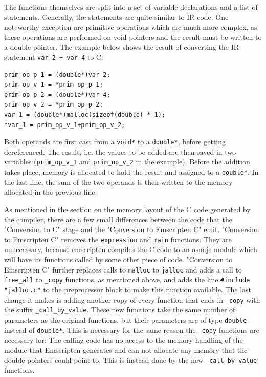 \documentclass[11pt]{report}
\begin{document}
The functions themselves are split into a set of variable declarations and a list of statements. Generally, the statements are quite similar to IR code. One noteworthy exception are primitive operations which are much more complex, as these operations are performed on void pointers and the result must be written to a double pointer. The example below shows the result of converting the IR statement \texttt{var_2 + var_4} to C:

\begin{lstlisting}
prim_op_p_1 = (double*)var_2;
prim_op_v_1 = *prim_op_p_1;
prim_op_p_2 = (double*)var_4;
prim_op_v_2 = *prim_op_p_2;
var_1 = (double*)malloc(sizeof(double) * 1);
*var_1 = prim_op_v_1+prim_op_v_2;
\end{lstlisting}

Both operands are first cast from a \texttt{void*} to a \texttt{double*}, before getting dereferenced. The result, i.e. the values to be added are then saved in two variables (\texttt{prim_op_v_1} and \texttt{prim_op_v_2} in the example). Before the addition takes place, memory is allocated to hold the result and assigned to a \texttt{double*}. In the last line, the sum of the two operands is then written to the memory allocated in the previous line.

As mentioned in the section on the memory layout of the C code generated by the compiler, there are a few small differences between the code that the "Conversion to C" stage and the "Conversion to Emscripten C" emit. "Conversion to Emscripten C" removes the \texttt{expression} and \texttt{main} functions. They are unnecessary, because emscripten compiles the C code to an asm.js module which will have its functions called by some other piece of code. "Conversion to Emscripten C" further replaces calls to \texttt{malloc} to \texttt{jalloc} and adds a call to \texttt{free_all} to \texttt{_copy} functions, as mentioned above, and adds the line \texttt{\#include "jalloc.c"} to the preprocessor block to make this function available. The last change it makes is adding another copy of every function that ends in \texttt{_copy} with the suffix \texttt{_call_by_value}. These new functions take the same number of parameters as the original functions, but their parameters are of type \texttt{double} instead of \texttt{double*}. This is necessary for the same reason the \texttt{_copy} functions are necessary for: The calling code has no access to the memory handling of the module that Emscripten generates and can not allocate any memory that the double pointers could point to. This is instead done by the new \texttt{_call_by_value} functions.
\end{document}

